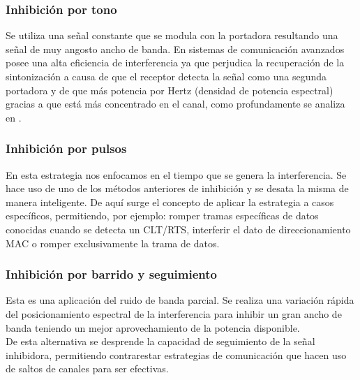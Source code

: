 \documentclass[12pt]{report}
\begin{document}
\subsubsection{Inhibición por tono}

Se utiliza una señal constante que se modula con la portadora resultando una señal de muy angosto ancho de banda. En sistemas de comunicación 
avanzados posee una alta eficiencia de interferencia ya que perjudica la recuperación de la sintonización a causa de que el receptor detecta 
la señal como una segunda portadora y de que más potencia por Hertz (densidad de potencia espectral) gracias a que está más concentrado
en el canal, como profundamente se analiza en \todo[inline, inlinewidth=3cm, noinlinepar]{[8]}.

\subsubsection{Inhibición por pulsos}

En esta estrategia nos enfocamos en el tiempo que se genera la interferencia. Se hace uso de uno de los métodos anteriores de inhibición
y se desata la misma de manera inteligente. De aquí surge el concepto de aplicar la estrategia a casos específicos, permitiendo, por ejemplo:
romper tramas específicas de datos conocidas cuando se detecta un CLT/RTS, interferir el dato de direccionamiento MAC o romper exclusivamente
la trama de datos.

\subsubsection{Inhibición por barrido y seguimiento}

Esta es una aplicación del ruido de banda parcial. Se realiza una variación rápida del posicionamiento espectral de la interferencia para inhibir
un gran ancho de banda teniendo un mejor aprovechamiento de la potencia disponible.\\
De esta alternativa se desprende la capacidad de seguimiento de la señal inhibidora, permitiendo contrarestar estrategias de comunicación que 
hacen uso de saltos de canales para ser efectivas.
\end{document}
